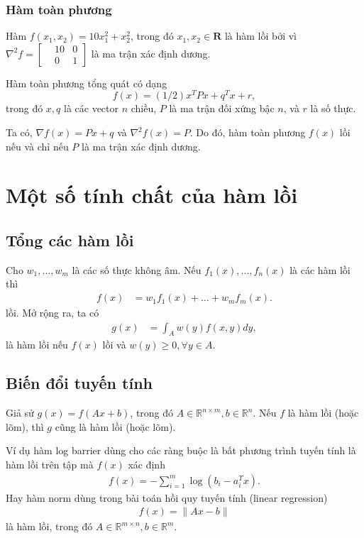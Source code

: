 \documentclass{book}
\begin{document}
\subsubsection*{Hàm toàn phương}
Hàm $f(x_1, x_2) = 10 x_1^2 + x_2^2$, trong đó $x_1, x_2 \in \mathbf{R}$ là hàm lồi 
bởi vì $\nabla^2 f = \begin{bmatrix}&10 & 0 \\&0 &1 \end{bmatrix}$ là ma trận xác định dương.

Hàm toàn phương tổng quát có dạng
\begin{equation}
f(x) = (1/2) x^T P x + q^T x + r,
\end{equation}
trong đó $x, q$ là các vector $n$ chiều, $P$ là ma trận đối xứng bậc $n$, và $r$ là số thực.

Ta có, $\nabla f(x) = Px + q$ và $\nabla^2 f(x) = P$.
Do đó, hàm toàn phương $f(x)$ lồi nếu và chỉ nếu $P$ là ma trận xác định dương.


\section{Một số tính chất của hàm lồi}

\subsection*{Tổng các hàm lồi}
Cho $w_1,...,w_m$ là các số thực không âm. Nếu $f_1(x),...,f_n(x)$ là các hàm lồi thì 
\begin{align*}
f(x) &= w_1 f_1(x) + \ldots + w_m f_m(x).
\end{align*}
lồi.
Mở rộng ra, ta có
\begin{align*}
g(x) &= \int_A w(y)f(x, y) dy,
\end{align*}
là hàm lồi nếu $f(x)$ lồi và $w(y) \geq 0, \forall y \in A$.

\subsection*{Biến đổi tuyến tính}
Giả sử $g(x) = f(Ax + b)$, trong đó $A \in \mathbb{R}^{n \times m}, b \in \mathbb{R}^n$. 
Nếu $f$ là hàm lồi (hoặc lõm), thì $g$ cũng là hàm lồi (hoặc lõm).

Ví dụ hàm log barrier dùng cho các ràng buộc là bất phương trình tuyến tính là hàm lồi trên tập mà $f(x)$ xác định
\begin{align*}
f(x) = - \sum^m_{i=1} \log(b_i - a^T_i x).
\end{align*}
Hay hàm norm dùng trong bài toán hồi quy tuyến tính (linear regression)
\begin{align*}
f(x) = \| Ax - b\|
\end{align*}
là hàm lồi, trong đó $A \in \mathbb{R}^{m \times n}, b \in \mathbb{R}^m$.
\end{document}
